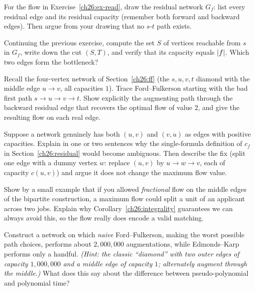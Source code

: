 \begin{exercise}
\label{ch26:ex-residual}
For the flow in Exercise~\ref{ch26:ex-read}, draw the residual network $G_f$:
list every residual edge and its residual capacity (remember both forward and
backward edges). Then argue from your drawing that no $s$-$t$ path exists.
\end{exercise}

\begin{exercise}
\label{ch26:ex-cut}
Continuing the previous exercise, compute the set $S$ of vertices reachable from
$s$ in $G_f$, write down the cut $(S,T)$, and verify that its capacity equals
$\lvert f\rvert$. Which two edges form the bottleneck?
\end{exercise}

\begin{exercise}
\label{ch26:ex-greedy}
Recall the four-vertex network of Section~\ref{ch26:ff} (the $s,u,v,t$ diamond
with the middle edge $u\to v$, all capacities $1$). Trace Ford--Fulkerson
starting with the bad first path $s\to u\to v\to t$. Show explicitly the
augmenting path through the backward residual edge that recovers the optimal
flow of value $2$, and give the resulting flow on each real edge.
\end{exercise}

\begin{exercise}
\label{ch26:ex-antiparallel}
Suppose a network genuinely has both $(u,v)$ and $(v,u)$ as edges with positive
capacities. Explain in one or two sentences why the single-formula definition of
$c_f$ in Section~\ref{ch26:residual} would become ambiguous. Then describe the
fix (split one edge with a dummy vertex $w$: replace $(u,v)$ by $u\to w\to v$,
each of capacity $c(u,v)$) and argue it does not change the maximum flow value.
\end{exercise}

\begin{exercise}
\label{ch26:ex-integrality}
Show by a small example that if you allowed \emph{fractional} flow on the middle
edges of the bipartite construction, a maximum flow could split a unit of an
applicant across two jobs. Explain why
Corollary~\ref{ch26:integrality} guarantees we can always avoid this, so the
flow really does encode a valid matching.
\end{exercise}

\begin{exercise}
\label{ch26:ex-count}
Construct a network on which \emph{naive} Ford--Fulkerson, making the worst
possible path choices, performs about $2{,}000{,}000$ augmentations, while
Edmonds--Karp performs only a handful. \emph{(Hint: the classic ``diamond''
with two outer edges of capacity $1{,}000{,}000$ and a middle edge of capacity
$1$; alternately augment through the middle.)} What does this say about the
difference between pseudo-polynomial and polynomial time?
\end{exercise}

